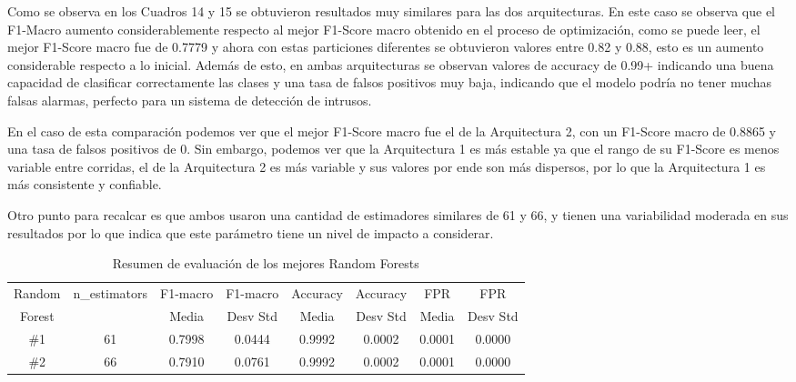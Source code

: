 \documentclass[12pt,a4paper]{article}
\begin{document}
Como se observa en los Cuadros 14 y 15 se obtuvieron resultados muy similares para las dos arquitecturas.
En este caso se observa que el F1-Macro aumento considerablemente respecto al mejor F1-Score macro
obtenido en el proceso de optimización, como se puede leer, el mejor F1-Score macro fue de 0.7779 y ahora
con estas particiones diferentes se obtuvieron valores entre 0.82 y 0.88, esto es un aumento considerable respecto
a lo inicial. Además de esto, en ambas arquitecturas se observan valores de accuracy de 0.99+ indicando una buena
capacidad de clasificar correctamente las clases y una tasa de falsos positivos muy baja, indicando que
el modelo podría no tener muchas falsas alarmas, perfecto para un sistema de detección de intrusos.

En el caso de esta comparación podemos ver que el mejor F1-Score macro fue el de la Arquitectura 2,
con un F1-Score macro de 0.8865 y una tasa de falsos positivos de 0. Sin embargo, podemos ver que la Arquitectura 1
es más estable ya que el rango de su F1-Score es menos variable entre corridas, el de la Arquitectura 2 es más variable
y sus valores por ende son más dispersos, por lo que la Arquitectura 1 es más consistente y confiable.

Otro punto para recalcar es que ambos usaron una cantidad de estimadores similares de 61 y 66, y tienen
una variabilidad moderada en sus resultados por lo que indica que este parámetro tiene un nivel de impacto a considerar.

\begin{table}[htbp]
  \centering
  \small
  \begin{tabular}{cccccccc}
    \hline
    Random & n\_estimators & F1-macro & F1-macro & Accuracy & Accuracy & FPR & FPR \\
    Forest &  & Media & Desv Std & Media & Desv Std & Media & Desv Std \\
    \hline
    \#1 & 61 & 0.7998 & 0.0444 & 0.9992 & 0.0002 & 0.0001 & 0.0000 \\
    \#2 & 66 & 0.7910 & 0.0761 & 0.9992 & 0.0002 & 0.0001 & 0.0000 \\
    \hline
  \end{tabular}
  \caption{Resumen de evaluación de los mejores Random Forests}
  \label{tab:rf-resumen-evaluacion}
\end{table}
\end{document}
